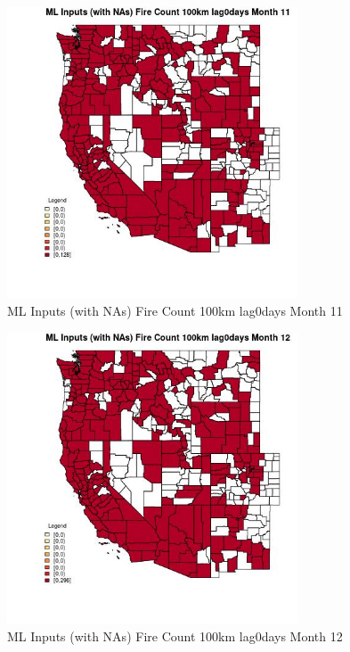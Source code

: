 \begin{figure} 
\centering  
\includegraphics[width=0.77\textwidth]{Code_Outputs/Report_ML_input_PM25_Step4_part_e_de_duplicated_aves_compiled_2019-05-20wNAs_CountyFire_Count_100km_lag0daysmedianMonth11.jpg} 
\caption{\label{fig:Report_ML_input_PM25_Step4_part_e_de_duplicated_aves_compiled_2019-05-20wNAsCountyFire_Count_100km_lag0daysmedianMonth11}ML Inputs (with NAs) Fire Count 100km lag0days Month 11} 
\end{figure} 
 

\begin{figure} 
\centering  
\includegraphics[width=0.77\textwidth]{Code_Outputs/Report_ML_input_PM25_Step4_part_e_de_duplicated_aves_compiled_2019-05-20wNAs_CountyFire_Count_100km_lag0daysmedianMonth12.jpg} 
\caption{\label{fig:Report_ML_input_PM25_Step4_part_e_de_duplicated_aves_compiled_2019-05-20wNAsCountyFire_Count_100km_lag0daysmedianMonth12}ML Inputs (with NAs) Fire Count 100km lag0days Month 12} 
\end{figure} 
 

